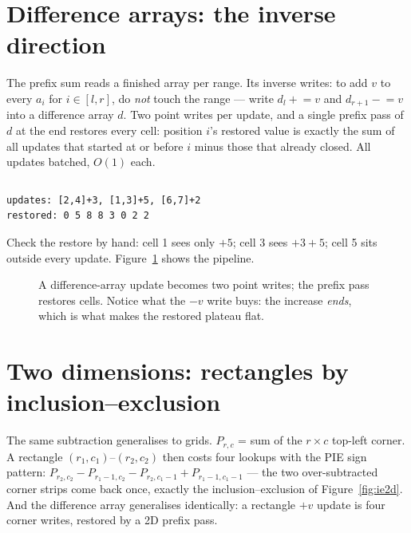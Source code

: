 \section{Difference arrays: the inverse direction}\label{sec:diff}

The prefix sum reads a finished array per range. Its inverse writes:
to add $v$ to every $a_i$ for $i \in [l, r]$, do \emph{not} touch the
range --- write $d_l \mathrel{+}= v$ and $d_{r+1} \mathrel{-}= v$ into
a difference array $d$. Two point writes per update, and a single
prefix pass of $d$ at the end restores every cell: position $i$'s
restored value is exactly the sum of all updates that started at or
before $i$ minus those that already closed. All updates batched, $O(1)$
each.

\begin{lstlisting}[language=C++,caption={\texttt{diff.h}: range updates
as two point writes, 1D and 2D.},label={lst:diff}]
\end{lstlisting}


\begin{lstlisting}[numbers=none,caption={\texttt{diff\_demo.cpp} real
output --- three updates, one restore.},label={lst:diffout}]
updates: [2,4]+3, [1,3]+5, [6,7]+2
restored: 0 5 8 8 3 0 2 2
\end{lstlisting}

Check the restore by hand: cell 1 sees only $+5$; cell 3 sees
$+3{+}5$; cell 5 sits outside every update. Figure~\ref{fig:diffpipe}
shows the pipeline.

\begin{figure}[ht]\centering

\caption{A difference-array update becomes two point writes; the
prefix pass restores cells. Notice what the $-v$ write buys: the
increase \emph{ends}, which is what makes the restored plateau flat.}
\label{fig:diffpipe}
\end{figure}

\section{Two dimensions: rectangles by inclusion--exclusion}\label{sec:2d}

The same subtraction generalises to grids. $P_{r,c}$ = sum of the
$r \times c$ top-left corner. A rectangle $(r_1, c_1)$--$(r_2, c_2)$
then costs four lookups with the PIE sign pattern:
$P_{r_2,c_2} - P_{r_1-1,c_2} - P_{r_2,c_1-1} + P_{r_1-1,c_1-1}$ ---
the two over-subtracted corner strips come back once, exactly the
inclusion--exclusion of Figure~\ref{fig:ie2d}. And the difference
array generalises identically: a rectangle $+v$ update is four corner
writes, restored by a 2D prefix pass.

